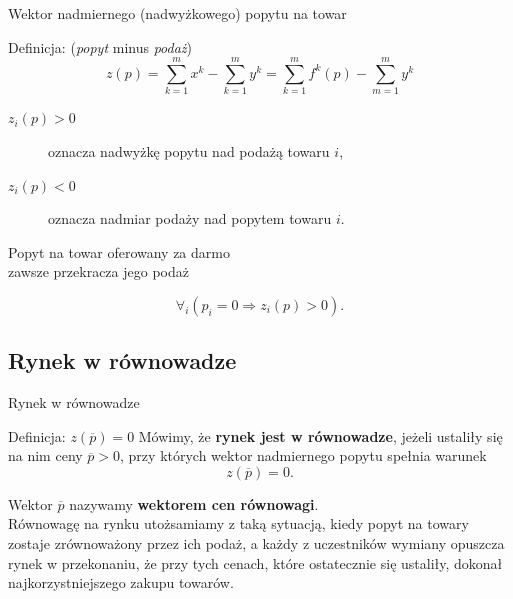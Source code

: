 \documentclass[a4paper, 11pt]{beamer}
\begin{document}
      \begin{frame}{Wektor nadmiernego (nadwyżkowego) popytu na towar}
	\begin{block}{Definicja: (\textit{popyt} minus \textit{podaż})}
	  $$z(p) = \sum_{k=1}^m x^k - \sum_{k=1}^m y^k = \sum_{k=1}^m f^k (p) -
	  \sum_{m=1}^m y^k$$
	\end{block}

	\begin{description}
	  
	  \item[$z_i (p) > 0$] oznacza nadwyżkę popytu nad podażą towaru $i$,

	  \item[$z_i (p) < 0$] oznacza nadmiar podaży nad popytem towaru $i$.

	\end{description}
	
	\begin{block}{}
	\begin{center}
	Popyt na towar oferowany za darmo\\ zawsze przekracza
	jego podaż
	\end{center}
	\[ \forall_i (p_i=0 \Rightarrow z_i (p) > 0). \]
	\end{block}
      \end{frame}

    \subsection{Rynek w równowadze}

      \begin{frame}{Rynek w równowadze}
	\begin{block}{Definicja: $z(\overline{p}) = 0$}
	  Mówimy, że \textbf{rynek jest w równowadze}, jeżeli ustaliły się na
	  nim ceny $\overline{p} > 0$, przy których wektor nadmiernego popytu
	  spełnia warunek
	  \[ z(\overline{p}) = 0. \]
	\end{block}

	Wektor $\overline{p}$ nazywamy \textbf{wektorem cen równowagi}.\\

	\vskip10pt
	Równowagę na rynku utożsamiamy z taką sytuacją, kiedy popyt na towary
	zostaje zrównoważony przez ich podaż, a każdy z uczestników wymiany
	opuszcza rynek w przekonaniu, że przy tych cenach, które ostatecznie się
	ustaliły, dokonał najkorzystniejszego zakupu towarów.
    \end{frame}
\end{document}
